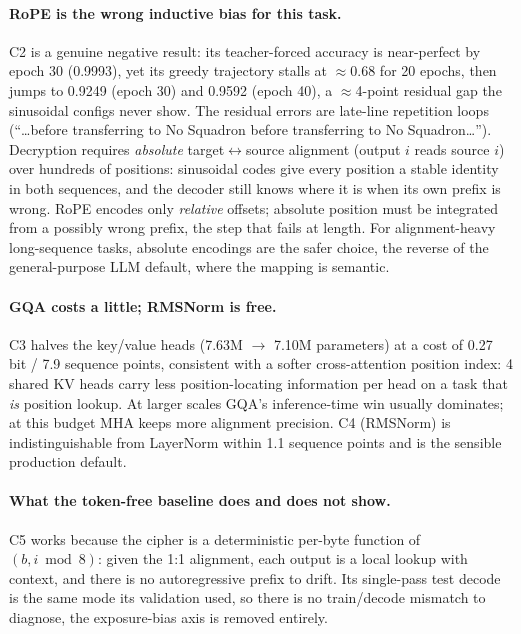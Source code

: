 \documentclass[12pt]{article}
\begin{document}
\paragraph{RoPE is the wrong inductive bias for this task.}
C2 is a genuine negative result: its teacher-forced accuracy is near-perfect by
epoch 30 (0.9993), yet its greedy trajectory stalls at $\approx$0.68 for 20
epochs, then jumps to 0.9249 (epoch 30) and 0.9592 (epoch 40), a
$\approx$4-point residual gap the sinusoidal configs never show. The residual
errors are late-line repetition loops (``\dots before transferring to No
Squadron before transferring to No Squadron\dots''). Decryption requires \emph{absolute}
target$\leftrightarrow$source alignment (output $i$ reads source $i$) over
hundreds of positions: sinusoidal codes give every position a stable identity in
both sequences, and the decoder still knows where it is when its own prefix is
wrong. RoPE encodes only \emph{relative} offsets; absolute position must be
integrated from a possibly wrong prefix, the step that fails at length. For
alignment-heavy long-sequence tasks, absolute encodings are the safer choice,
the reverse of the general-purpose LLM default, where the mapping is semantic.

\paragraph{GQA costs a little; RMSNorm is free.}
C3 halves the key/value heads (7.63M $\to$ 7.10M parameters) at a cost of 0.27
bit / 7.9 sequence points, consistent with a softer cross-attention position
index: 4 shared KV heads carry less position-locating information per head on a
task that \emph{is} position lookup. At larger scales GQA's inference-time win
usually dominates; at this budget MHA keeps more alignment precision. C4
(RMSNorm) is indistinguishable from LayerNorm within 1.1 sequence points and is
the sensible production default.

\paragraph{What the token-free baseline does and does not show.}
C5 works because the cipher is a deterministic per-byte function of
$(b, i \bmod 8)$: given the 1:1 alignment, each output is a local lookup with
context, and there is no autoregressive prefix to drift. Its single-pass test
decode is the same mode its validation used, so there is no train/decode
mismatch to diagnose, the exposure-bias axis is removed entirely.
\end{document}
